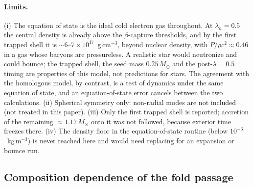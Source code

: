 \documentclass[11pt]{article}
\begin{document}
\paragraph{Limits.} (i) The equation of state is the ideal cold electron gas throughout. At $\lambda_h=0.5$ the central density is already above the $\beta$-capture thresholds, and by the first trapped shell it is $\sim6$--$7\times10^{17}$~g\,cm$^{-3}$, beyond nuclear density, with $P/\rho c^2\approx0.46$ in a gas whose baryons are pressureless. A realistic star would neutronize and could bounce; the trapped shell, the seed mass $0.25\,M_\odot$ and the post-$\lambda=0.5$ timing are properties of this model, not predictions for stars. The agreement with the homologous model, by contrast, is a test of dynamics under the same equation of state, and an equation-of-state error cancels between the two calculations. (ii) Spherical symmetry only: non-radial modes are not included (not treated in this paper). (iii) Only the first trapped shell is reported; accretion of the remaining $\approx1.17\,M_\odot$ onto it was not followed, because exterior time freezes there. (iv) The density floor in the equation-of-state routine (below $10^{-3}$~kg\,m$^{-3}$) is never reached here and would need replacing for an expansion or bounce run.

\subsection{Composition dependence of the fold passage}
\label{sec:fold-comp}
\end{document}
